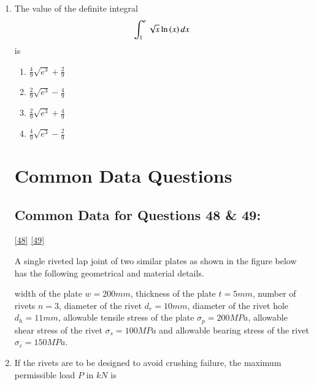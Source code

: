 \documentclass[journal]{IEEEtran}
\numberwithin{equation}{enumi}
\numberwithin{figure}{enumi}
\begin{document}
\begin{enumerate}
    \item 
    The value of the definite integral
    \begin{align*}
        \int_1^e \sqrt{x}\ln{\ensuremath{\left(x\right)}}\, dx
    \end{align*}
    is
    \hfill{}

    \begin{multicols}{4}
        \begin{enumerate}
            \item $\frac{4}{9}\sqrt{e^3} + \frac{2}{9}$
            \item $\frac{2}{9}\sqrt{e^3} - \frac{4}{9}$
            \item $\frac{2}{9}\sqrt{e^3} + \frac{4}{9}$
            \item $\frac{4}{9}\sqrt{e^3} - \frac{2}{9}$
        \end{enumerate}
    \end{multicols}

    \section{Common Data Questions}

    \subsection{Common Data for Questions 48 \& 49: }\ref{48} \ref{49}
   
    A single riveted lap joint of two similar plates as shown in the figure below has the following geometrical
    and material details.
    
    \begin{figure}[H]
    \centering
    \resizebox{0.8\textwidth}{!}{}
    \end{figure}

    width of the plate $w = 200 mm$, thickness of the plate $t = 5 mm$, number of rivets $n = 3$, diameter of the rivet $d_r = 10 mm$, diameter of the rivet hole $d_h = 11 mm$, allowable tensile stress of the plate $\sigma_p = 200 MPa$, allowable shear stress of the rivet $\sigma_s = 100 MPa$ and allowable bearing stress of the rivet $\sigma_c = 150 MPa$.\\

    \item 
    If the rivets are to be designed to avoid crushing failure, the maximum permissible load $P$ in $kN$ is \label{48}
    \hfill{}


\end{enumerate}
\end{document}
